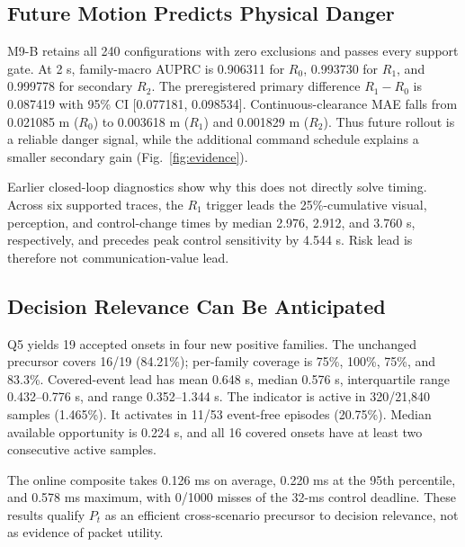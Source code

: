 \documentclass[letterpaper,10pt,conference]{ieeeconf}
\begin{document}
\subsection{Future Motion Predicts Physical Danger}
M9-B retains all 240 configurations with zero exclusions and passes every
support gate. At 2 s, family-macro AUPRC is 0.906311 for $R_0$, 0.993730 for
$R_1$, and 0.999778 for secondary $R_2$. The preregistered primary difference
$R_1-R_0$ is 0.087419 with 95\% CI [0.077181, 0.098534]. Continuous-clearance
MAE falls from 0.021085 m ($R_0$) to 0.003618 m ($R_1$) and 0.001829 m
($R_2$). Thus future rollout is a reliable danger signal, while the additional
command schedule explains a smaller secondary gain (Fig.~\ref{fig:evidence}).

Earlier closed-loop diagnostics show why this does not directly solve timing.
Across six supported traces, the $R_1$ trigger leads the 25\%-cumulative visual,
perception, and control-change times by median 2.976, 2.912, and 3.760 s,
respectively, and precedes peak control sensitivity by 4.544 s. Risk lead is
therefore not communication-value lead.

\subsection{Decision Relevance Can Be Anticipated}
Q5 yields 19 accepted onsets in four new positive families. The unchanged
precursor covers 16/19 (84.21\%); per-family coverage is 75\%, 100\%, 75\%,
and 83.3\%. Covered-event lead has mean 0.648 s, median 0.576 s, interquartile
range 0.432--0.776 s, and range 0.352--1.344 s. The indicator is active in
320/21,840 samples (1.465\%). It activates in 11/53 event-free episodes
(20.75\%). Median available opportunity is 0.224 s, and all 16 covered onsets
have at least two consecutive active samples.

The online composite takes 0.126 ms on average, 0.220 ms at the 95th
percentile, and 0.578 ms maximum, with 0/1000 misses of the 32-ms control
deadline. These results qualify $P_t$ as an efficient cross-scenario precursor
to decision relevance, not as evidence of packet utility.
\end{document}
